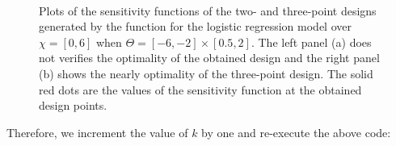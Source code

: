 \begin{figure}[t!]
\centering
{}
\\
\caption{
  Plots of the  sensitivity functions of  the two- and three-point designs generated by the   function for the logistic regression model over $ \chi = [0, 6]$ when $\Theta = [-6, -2]\times[0.5, 2]$.  The left panel (a) does not verifies the optimality of the obtained design and the right panel (b) shows the nearly optimality of the three-point design.  The solid red dots are the values of the sensitivity function at the obtained design points.
}
\label{fig:sensitivity-logistic-minimax}
\end{figure}
Therefore, we increment the value of $k$ by one and re-execute the above code:

